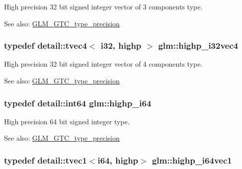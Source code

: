High precision 32 bit signed integer vector of 3 components type. \begin{Desc}
\item[See also:]\hyperlink{group__gtc__type__precision}{GLM\_\-GTC\_\-type\_\-precision} \end{Desc}
\hypertarget{group__gtc__type__precision_g174af0fafdc5a9eb24150792bffa8b5c}{
\subsubsection[highp\_\-i32vec4]{\setlength{\rightskip}{0pt plus 5cm}typedef detail::tvec4$<$ i32, highp $>$ {\bf glm::highp\_\-i32vec4}}}
\label{group__gtc__type__precision_g174af0fafdc5a9eb24150792bffa8b5c}


High precision 32 bit signed integer vector of 4 components type. \begin{Desc}
\item[See also:]\hyperlink{group__gtc__type__precision}{GLM\_\-GTC\_\-type\_\-precision} \end{Desc}
\hypertarget{group__gtc__type__precision_gd3cb9a0ac0266ea2c51c6fac256345d1}{
\subsubsection[highp\_\-i64]{\setlength{\rightskip}{0pt plus 5cm}typedef detail::int64 {\bf glm::highp\_\-i64}}}
\label{group__gtc__type__precision_gd3cb9a0ac0266ea2c51c6fac256345d1}


High precision 64 bit signed integer type. \begin{Desc}
\item[See also:]\hyperlink{group__gtc__type__precision}{GLM\_\-GTC\_\-type\_\-precision} \end{Desc}
\hypertarget{group__gtc__type__precision_g06c21aba992669f5c160ec5f5a480522}{
\subsubsection[highp\_\-i64vec1]{\setlength{\rightskip}{0pt plus 5cm}typedef detail::tvec1$<$i64, highp$>$ {\bf glm::highp\_\-i64vec1}}}
\label{group__gtc__type__precision_g06c21aba992669f5c160ec5f5a480522}


